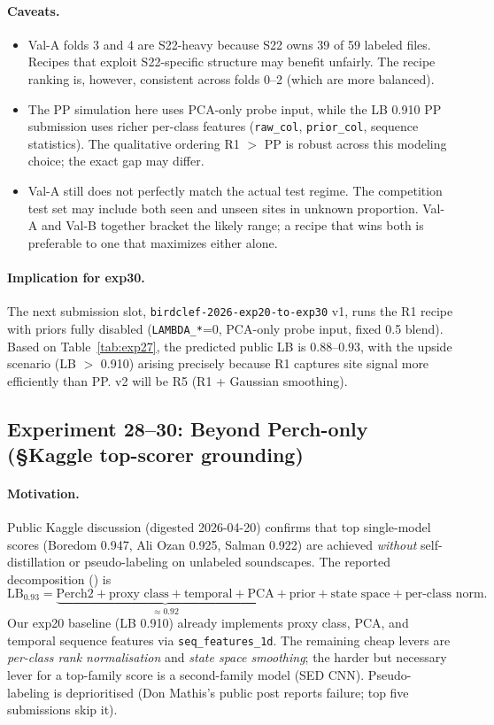 \paragraph{Caveats.}
\begin{itemize}
\item Val-A folds 3 and 4 are S22-heavy because S22 owns 39 of 59
labeled files. Recipes that exploit S22-specific structure may
benefit unfairly. The recipe ranking is, however, consistent
across folds 0--2 (which are more balanced).
\item The PP simulation here uses PCA-only probe input, while the
LB 0.910 PP submission uses richer per-class features
(\texttt{raw\_col}, \texttt{prior\_col}, sequence statistics).
The qualitative ordering R1 $>$ PP is robust across this
modeling choice; the exact gap may differ.
\item Val-A still does not perfectly match the actual test regime.
The competition test set may include both seen and unseen sites
in unknown proportion. Val-A and Val-B together bracket the
likely range; a recipe that wins both is preferable to one that
maximizes either alone.
\end{itemize}

\paragraph{Implication for exp30.} The next submission slot,
\texttt{birdclef-2026-exp20-to-exp30} v1, runs the R1 recipe with
priors fully disabled (\texttt{LAMBDA\_*}=0, PCA-only probe input,
fixed 0.5 blend). Based on Table~\ref{tab:exp27}, the predicted
public LB is $0.88$--$0.93$, with the upside scenario (LB $>$ 0.910)
arising precisely because R1 captures site signal more efficiently
than PP. v2 will be R5 (R1 + Gaussian smoothing).

\subsection{Experiment 28--30: Beyond Perch-only (\S Kaggle top-scorer grounding)}
\label{sec:exp28_30}

\paragraph{Motivation.} Public Kaggle discussion (digested 2026-04-20)
confirms that top single-model scores (Boredom 0.947, Ali Ozan 0.925,
Salman 0.922) are achieved \emph{without} self-distillation or
pseudo-labeling on unlabeled soundscapes. The reported decomposition
(\citeauthor{hengck23}) is
\[
\text{LB}_{0.93} = \underbrace{\text{Perch2} + \text{proxy class} + \text{temporal} + \text{PCA}}_{\approx 0.92} + \text{prior} + \text{state space} + \text{per-class norm}.
\]
Our exp20 baseline (LB 0.910) already implements proxy class, PCA,
and temporal sequence features via
\texttt{seq\_features\_1d}. The remaining cheap levers are
\emph{per-class rank normalisation} and \emph{state space smoothing};
the harder but necessary lever for a top-family score is a
second-family model (SED CNN). Pseudo-labeling is deprioritised
(Don Mathis's public post reports failure; top five submissions skip
it).

